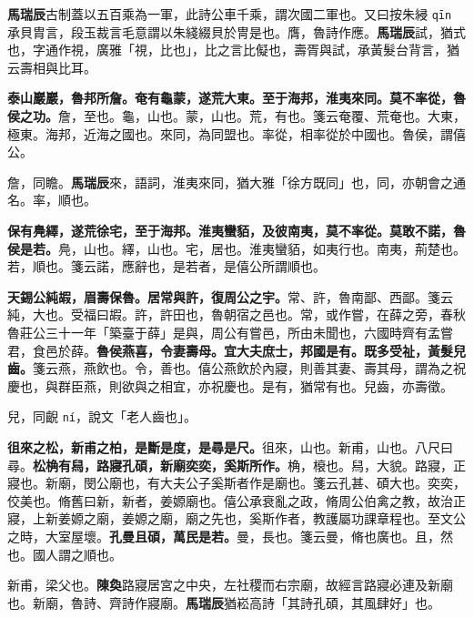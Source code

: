 \begin{quoting}\textbf{馬瑞辰}古制蓋以五百乘為一軍，此詩公車千乘，謂次國二軍也。又曰按朱綅 \texttt{qīn} 承貝胄言，段玉裁言毛意謂以朱綫綴貝於冑是也。膺，魯詩作應。\textbf{馬瑞辰}試，猶式也，字通作視，廣雅「視，比也」，比之言比儗也，壽胥與試，承黃髮台背言，猶云壽相與比耳。\end{quoting}

\textbf{泰山巖巖，魯邦所詹。奄有龜蒙，遂荒大東。至于海邦，淮夷來同。莫不率從，魯侯之功。}{\footnotesize 詹，至也。龜，山也。蒙，山也。荒，有也。箋云奄覆、荒奄也。大東，極東。海邦，近海之國也。來同，為同盟也。率從，相率從於中國也。魯侯，謂僖公。}

\begin{quoting}詹，同瞻。\textbf{馬瑞辰}來，語詞，淮夷來同，猶大雅「徐方既同」也，同，亦朝會之通名。率，順也。\end{quoting}

\textbf{保有鳧繹，遂荒徐宅，至于海邦。淮夷蠻貊，及彼南夷，莫不率從。莫敢不諾，魯侯是若。}{\footnotesize 鳧，山也。繹，山也。宅，居也。淮夷蠻貊，如夷行也。南夷，荊楚也。若，順也。箋云諾，應辭也，是若者，是僖公所謂順也。}

\textbf{天錫公純嘏，眉壽保魯。居常與許，復周公之宇。}{\footnotesize 常、許，魯南鄙、西鄙。箋云純，大也。受福曰嘏。許，許田也，魯朝宿之邑也。常，或作嘗，在薛之旁，春秋魯莊公三十一年「築臺于薛」是與，周公有嘗邑，所由未聞也，六國時齊有孟嘗君，食邑於薛。}\textbf{魯侯燕喜，令妻壽母。宜大夫庶士，邦國是有。既多受祉，黃髮兒齒。}{\footnotesize 箋云燕，燕飲也。令，善也。僖公燕飲於內寢，則善其妻、壽其母，謂為之祝慶也，與群臣燕，則欲與之相宜，亦祝慶也。是有，猶常有也。兒齒，亦壽徵。}

\begin{quoting}兒，同齯 \texttt{ní}，說文「老人齒也」。\end{quoting}

\textbf{徂來之松，新甫之柏，是斷是度，是尋是尺。}{\footnotesize 徂來，山也。新甫，山也。八尺曰尋。}\textbf{松桷有舄，路寢孔碩，新廟奕奕，奚斯所作。}{\footnotesize 桷，榱也。舄，大貌。路寢，正寢也。新廟，閔公廟也，有大夫公子奚斯者作是廟也。箋云孔甚、碩大也。奕奕，佼美也。脩舊曰新，新者，姜嫄廟也。僖公承衰亂之政，脩周公伯禽之教，故治正寢，上新姜嫄之廟，姜嫄之廟，廟之先也，奚斯作者，教護屬功課章程也。至文公之時，大室屋壞。}\textbf{孔曼且碩，萬民是若。}{\footnotesize 曼，長也。箋云曼，脩也廣也。且，然也。國人謂之順也。}

\begin{quoting}新甫，梁父也。\textbf{陳奐}路寢居宮之中央，左社稷而右宗廟，故經言路寢必連及新廟也。新廟，魯詩、齊詩作寢廟。\textbf{馬瑞辰}猶崧高詩「其詩孔碩，其風肆好」也。\end{quoting}


